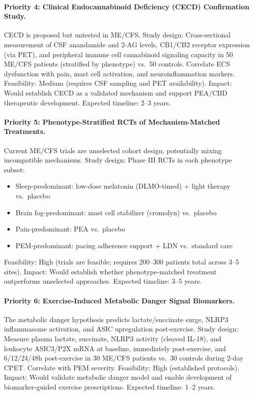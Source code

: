 \paragraph{Priority 4: Clinical Endocannabinoid Deficiency (CECD) Confirmation Study.}
CECD is proposed but untested in ME/CFS. Study design: Cross-sectional measurement of CSF anandamide and 2-AG levels, CB1/CB2 receptor expression (via PET), and peripheral immune cell cannabinoid signaling capacity in 50 ME/CFS patients (stratified by phenotype) vs.~50 controls. Correlate ECS dysfunction with pain, mast cell activation, and neuroinflammation markers. Feasibility: Medium (requires CSF sampling and PET availability). Impact: Would establish CECD as a validated mechanism and support PEA/CBD therapeutic development. Expected timeline: 2--3 years.

\paragraph{Priority 5: Phenotype-Stratified RCTs of Mechanism-Matched Treatments.}
Current ME/CFS trials are unselected cohort design, potentially mixing incompatible mechanisms. Study design: Phase III RCTs in each phenotype subset:
\begin{itemize}
  \item Sleep-predominant: low-dose melatonin (DLMO-timed) + light therapy vs.~placebo
  \item Brain fog-predominant: mast cell stabilizer (cromolyn) vs.~placebo
  \item Pain-predominant: PEA vs.~placebo
  \item PEM-predominant: pacing adherence support + LDN vs.~standard care
\end{itemize}
Feasibility: High (trials are feasible; requires 200--300 patients total across 3--5 sites). Impact: Would establish whether phenotype-matched treatment outperforms unselected approaches. Expected timeline: 3--5 years.

\paragraph{Priority 6: Exercise-Induced Metabolic Danger Signal Biomarkers.}
The metabolic danger hypothesis predicts lactate/succinate surge, NLRP3 inflammasome activation, and ASIC upregulation post-exercise. Study design: Measure plasma lactate, succinate, NLRP3 activity (cleaved IL-18), and leukocyte ASIC3/P2X mRNA at baseline, immediately post-exercise, and 6/12/24/48h post-exercise in 30 ME/CFS patients vs.~30 controls during 2-day CPET. Correlate with PEM severity. Feasibility: High (established protocols). Impact: Would validate metabolic danger model and enable development of biomarker-guided exercise prescriptions. Expected timeline: 1--2 years.

